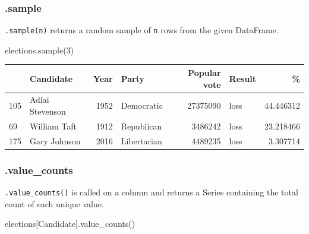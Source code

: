 \documentclass[
  letterpaper,
  DIV=11,
  numbers=noendperiod]{scrreprt}
\newenvironment{Shaded}{\begin{snugshade}}{\end{snugshade}}
\newcommand{\DecValTok}[1]{\textcolor[rgb]{0.68,0.00,0.00}{#1}}
\newcommand{\NormalTok}[1]{\textcolor[rgb]{0.00,0.23,0.31}{#1}}
\newcommand{\StringTok}[1]{\textcolor[rgb]{0.13,0.47,0.30}{#1}}
\begin{document}
\hypertarget{sample}{%
\subsubsection{.sample}\label{sample}}

\texttt{.sample(n)} returns a random sample of \texttt{n} rows from the
given DataFrame.

\begin{Shaded}
\begin{Highlighting}[]
\NormalTok{elections.sample(}\DecValTok{3}\NormalTok{)}
\end{Highlighting}
\end{Shaded}

\begin{tabular}{llrlrlr}
\toprule
{} &        Candidate &  Year &        Party &  Popular vote & Result &          \% \\
\midrule
105 &  Adlai Stevenson &  1952 &   Democratic &      27375090 &   loss &  44.446312 \\
69  &     William Taft &  1912 &   Republican &       3486242 &   loss &  23.218466 \\
175 &     Gary Johnson &  2016 &  Libertarian &       4489235 &   loss &   3.307714 \\
\bottomrule
\end{tabular}

\hypertarget{value_counts}{%
\subsubsection{.value\_counts}\label{value_counts}}

\texttt{.value\_counts()} is called on a column and returns a Series
containing the total count of each unique value.

\begin{Shaded}
\begin{Highlighting}[]
\NormalTok{elections[}\StringTok{\textquotesingle{}Candidate\textquotesingle{}}\NormalTok{].value\_counts()}
\end{Highlighting}
\end{Shaded}
\end{document}
